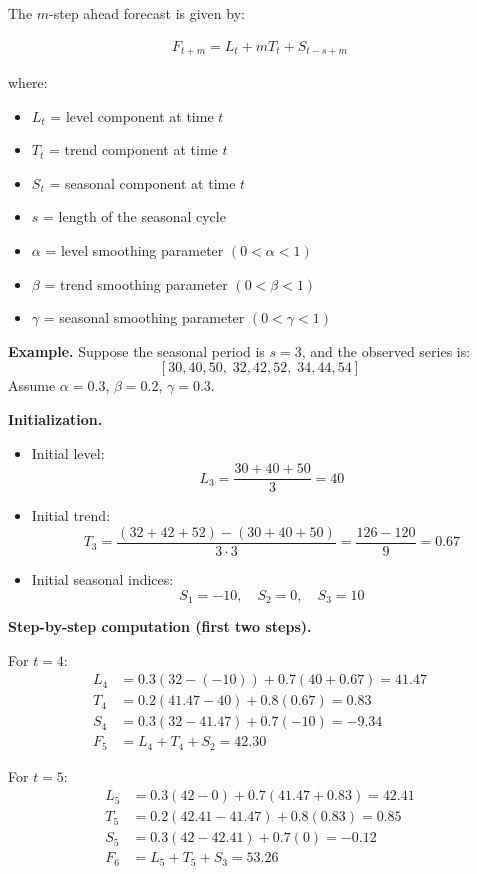 \documentclass[10pt,a4paper]{article}
\begin{document}
	The $m$-step ahead forecast is given by:
	
	\begin{align*}
	F_{t+m} = L_t + mT_t + S_{t-s+m}
	\end{align*}
	
	where:
	
	\begin{itemize}
	\item $L_t$ = level component at time $t$
	\item $T_t$ = trend component at time $t$
	\item $S_t$ = seasonal component at time $t$
	\item $s$ = length of the seasonal cycle
	\item $\alpha$ = level smoothing parameter $(0<\alpha<1)$
	\item $\beta$ = trend smoothing parameter $(0<\beta<1)$
	\item $\gamma$ = seasonal smoothing parameter $(0<\gamma<1)$
	\end{itemize}
	
	\textbf{Example.} Suppose the seasonal period is $s=3$, and the observed series is:
	\[
	[30, 40, 50, \; 32, 42, 52, \; 34, 44, 54]
	\]
	Assume $\alpha = 0.3$, $\beta = 0.2$, $\gamma = 0.3$.
	
	\medskip
	
	\textbf{Initialization.}
	\begin{itemize}
	\item Initial level:
	\[
	L_3 = \frac{30 + 40 + 50}{3} = 40
	\]
	\item Initial trend:
	\[
	T_3 = \frac{(32+42+52) - (30+40+50)}{3 \cdot 3} = \frac{126 - 120}{9} = 0.67
	\]
	\item Initial seasonal indices:
	\[
	S_1 = -10,\quad S_2 = 0,\quad S_3 = 10
	\]
	\end{itemize}
	
	\medskip
	
	\textbf{Step-by-step computation (first two steps).}
	
	For $t=4$:
	\begin{align*}
	L_4 &= 0.3(32 - (-10)) + 0.7(40 + 0.67) = 41.47 \\
	T_4 &= 0.2(41.47 - 40) + 0.8(0.67) = 0.83 \\
	S_4 &= 0.3(32 - 41.47) + 0.7(-10) = -9.34 \\
	F_5 &= L_4 + T_4 + S_2 = 42.30
	\end{align*}
	
	For $t=5$:
	\begin{align*}
	L_5 &= 0.3(42 - 0) + 0.7(41.47 + 0.83) = 42.41 \\
	T_5 &= 0.2(42.41 - 41.47) + 0.8(0.83) = 0.85 \\
	S_5 &= 0.3(42 - 42.41) + 0.7(0) = -0.12 \\
	F_6 &= L_5 + T_5 + S_3 = 53.26
	\end{align*}
	
\end{document}
